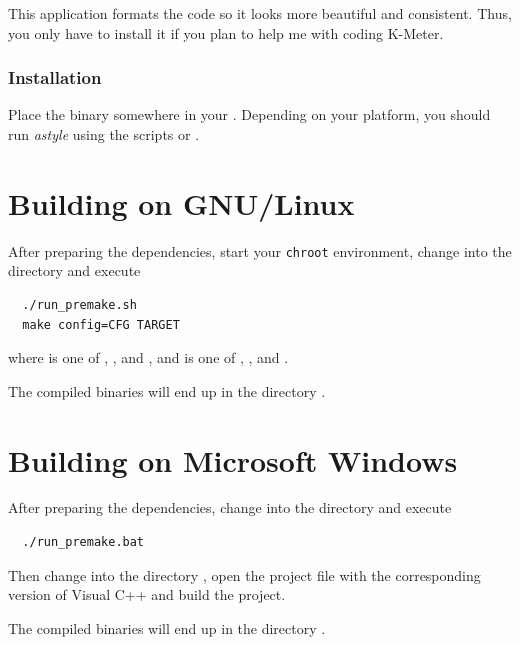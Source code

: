 This application formats the code so it looks more beautiful and
consistent.  Thus, you only have to install it if you plan to help me
with coding K-Meter.

\subsubsection{Installation}

Place the binary somewhere in your .  Depending on your
platform, you should run \emph{astyle} using the scripts
 or .

\section{Building on GNU/Linux}

After preparing the dependencies, start your \texttt{chroot}
environment, change into the directory  and execute

\begin{verbatim}
  ./run_premake.sh
  make config=CFG TARGET
\end{verbatim}

where  is one of ,
,  and
, and  is one of
,
,
 and
.

The compiled binaries will end up in the directory .

\section{Building on Microsoft Windows}

After preparing the dependencies, change into the directory
 and execute

\begin{verbatim}
  ./run_premake.bat
\end{verbatim}

Then change into the directory , open the
project file with the corresponding version of Visual C++ and build
the project.

The compiled binaries will end up in the directory .






